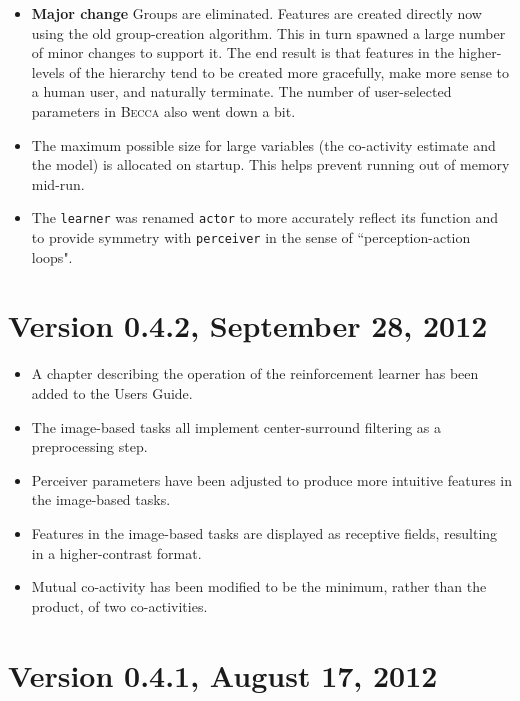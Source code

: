 \begin{itemize}
\item {\bf Major change} Groups are eliminated. Features are created directly now using the old group-creation algorithm. This in turn spawned a large number of minor changes to support it. The end result is that features in the higher-levels of the hierarchy tend to be created more gracefully, make more sense to a human user, and naturally terminate. The number of user-selected parameters in \textsc{Becca} also went down a bit.
\item The maximum possible size for large variables (the co-activity estimate and the model) is allocated on startup. This helps prevent running out of memory mid-run.
\item The \texttt{learner} was renamed \texttt{actor} to more accurately reflect its function and to provide symmetry with \texttt{perceiver} in the sense of ``perception-action loops". 
\end{itemize}

\section*{Version 0.4.2, September 28, 2012}

\begin{itemize}
\item A chapter describing the operation of the reinforcement learner has been added to the Users Guide.
\item The image-based tasks all implement center-surround filtering as a preprocessing step.
\item Perceiver parameters have been adjusted to produce more intuitive features in the image-based tasks.
\item Features in the image-based tasks are displayed as receptive fields, resulting in a higher-contrast format.
\item Mutual co-activity has been modified to be the minimum, rather than the product, of two co-activities.
\end{itemize}


\section*{Version 0.4.1, August 17, 2012}


